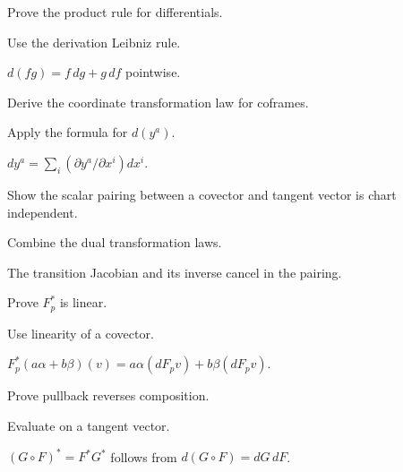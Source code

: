 \begin{exercise}\label{exr:vii05-07}
Prove the product rule for differentials.
\end{exercise}
\begin{hint}
Use the derivation Leibniz rule.
\end{hint}
\begin{solution}
\(d(fg)=f\,dg+g\,df\) pointwise.
\end{solution}

\begin{exercise}\label{exr:vii05-08}
Derive the coordinate transformation law for coframes.
\end{exercise}
\begin{hint}
Apply the formula for \(d(y^a)\).
\end{hint}
\begin{solution}
\(dy^a=\sum_i(\partial y^a/\partial x^i)dx^i\).
\end{solution}

\begin{exercise}\label{exr:vii05-09}
Show the scalar pairing between a covector and tangent vector is chart independent.
\end{exercise}
\begin{hint}
Combine the dual transformation laws.
\end{hint}
\begin{solution}
The transition Jacobian and its inverse cancel in the pairing.
\end{solution}

\begin{exercise}\label{exr:vii05-10}
Prove \(F_p^*\) is linear.
\end{exercise}
\begin{hint}
Use linearity of a covector.
\end{hint}
\begin{solution}
\(F_p^*(a\alpha+b\beta)(v)=a\alpha(dF_pv)+b\beta(dF_pv)\).
\end{solution}

\begin{exercise}\label{exr:vii05-11}
Prove pullback reverses composition.
\end{exercise}
\begin{hint}
Evaluate on a tangent vector.
\end{hint}
\begin{solution}
\((G\circ F)^*=F^*G^*\) follows from \(d(G\circ F)=dG\,dF\).
\end{solution}

